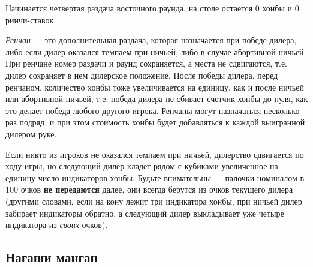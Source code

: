 Начинается четвертая раздача восточного раунда, на столе остается 0 хонбы и 0 риичи-ставок.

\textit{Ренчан} --- это дополнительная раздача, которая назначается при победе дилера, либо если дилер оказался темпаем при ничьей, либо в случае абортивной ничьей. При ренчане номер раздачи и раунд сохраняется, а места не сдвигаются, т.е. дилер сохраняет в нем дилерское положение. После победы дилера, перед ренчаном, количество хонбы тоже увеличивается на единицу, как и после ничьей или абортивной ничьей, т.е. победа дилера не сбивает счетчик хонбы до нуля, как это делает победа любого другого игрока. Ренчаны могут назначаться несколько раз подряд, и при этом стоимость хонбы будет добавляться к каждой выигранной дилером руке.

Если никто из игроков не оказался темпаем при ничьей, дилерство сдвигается по ходу игры, но следующий дилер кладет рядом с кубиками увеличенное на единицу число индикаторов хонбы. Будьте внимательны --- палочки номиналом в 100 очков \textbf{не передаются} далее, они всегда берутся из очков текущего дилера (другими словами, если на кону лежит три индикатора хонбы, при ничьей дилер забирает индикаторы обратно, а следующий дилер выкладывает уже четыре индикатора из \textit{своих} очков).

\subsection{Нагаши манган}

